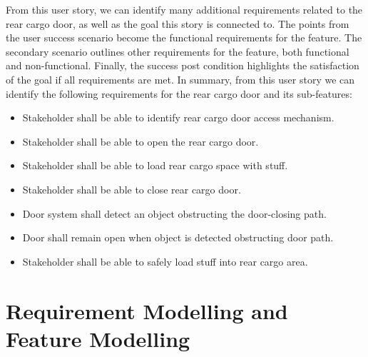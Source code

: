 From this user story, we can identify many additional requirements related to the rear cargo door, as well as the goal this story is connected to. The points from the user success scenario become the functional requirements for the feature. The secondary scenario outlines other requirements for the feature, both functional and non-functional. Finally, the success post condition highlights the satisfaction of the goal if all requirements are met. In summary, from this user story we can identify the following requirements for the rear cargo door and its sub-features:
\begin{itemize}
	\item Stakeholder shall be able to identify rear cargo door access mechanism.
	\item Stakeholder shall be able to open the rear cargo door.
	\item Stakeholder shall be able to load rear cargo space with stuff.
	\item Stakeholder shall be able to close rear cargo door.
	\item Door system shall detect an object obstructing the door-closing path. 
	\item Door shall remain open when object is detected obstructing door path.
	\item Stakeholder shall be able to safely load stuff into rear cargo area.
\end{itemize}

\section{Requirement Modelling and Feature Modelling}

